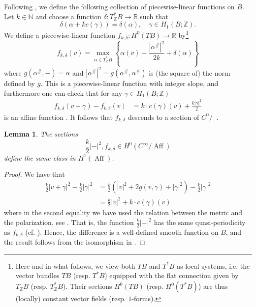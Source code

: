 \documentclass[10pt]{amsart}
\newtheorem{lem}[thm]{Lemma}
\theoremstyle{definition}
\theoremstyle{remark}
\def\N{\mathbb{N}}
\def\R{\mathbb{R}}
\def\Z{\mathbb{Z}}
\DeclareMathOperator{\Aff}{Aff}
\DeclareMathOperator{\AffZ}{\Aff_{\Z}}
\begin{document}
Following \cite[Section 3.7]{sheridan2021lagrangian}, we define the following collection of piecewise-linear functions on $B$.
Let $k \in \N$ and choose a function $\delta: T^*_\Z B \to \R$ such that 
\begin{equation}\label{eq:periodicitydelta}
    \delta(\alpha + kc(\gamma)) = \delta(\alpha), \quad \gamma \in H_1(B;\Z).
\end{equation}
We define a piecewise-linear function $f_{k,\delta} : H^0(TB) \to \R$ by\footnote{Here and in what follows, we view both $TB$ and $T^*B$ as local systems, i.e. the vector bundles $TB$ (resp. $T^*B$) equipped with the flat connection given by $T_\Z B$ (resp. $T^*_\Z B$). Their sections $H^0(TB)$ (resp. $H^0(T^*B)$) are thus  (locally) constant vector fields (resp. $1$-forms).}
\begin{equation}\label{eq:fkdeltadefn}
    f_{k,\delta}(v) = \max_{\alpha\in T^*_\Z B}
    \left\lbrace
        \alpha(v) - \frac{|\alpha^\#|^2}{2k} + \delta(\alpha)
    \right\rbrace
\end{equation}
where $g(\alpha^\#,-)=\alpha$ and $|\alpha^\#|^2 = g(\alpha^\#,\alpha^\#)$ is (the square of) the norm defined by $g$.
This is a piecewise-linear function with integer slope, and furthermore one can check that for any $\gamma \in H_1(B;\Z)$ 
\begin{align}\label{eq:periodicityfdelta}
    f_{k,\delta}(v + \gamma) - f_{k,\delta}(v) &= k\cdot c(\gamma)(v) + \frac{k |\gamma|^2}{2}
\end{align}
is an affine function \cite[Lemma 3.23]{sheridan2021lagrangian}.
It follows that $f_{k,\delta}$ descends to a section of $C^0/\AffZ$.

\begin{lem}\label{lem:appproximationfdelta}
    The sections
    $$
    \frac{k}{2}|-|^2, f_{k,\delta} \in H^0(C^\infty/\Aff)
    $$
    define the same class in $H^1(\Aff)$.
\end{lem}
\begin{proof}
    We have that
    \begin{align*}
        \frac{k}{2}|v+\gamma|^2 - \frac{k}{2}|\gamma|^2 
        &= \frac{k}{2}\left(|v|^2 + 2g(v,\gamma) + |\gamma|^2\right) - \frac{k}{2}|\gamma|^2 \\
        &= \frac{k}{2}|v|^2 + k\cdot c(\gamma)(v) 
    \end{align*}
    where in the second equality we have used the relation between the metric and the polarization, see .
    That is, the function $\frac{k}{2}|-|^2$ has the same quasi-periodicity as $f_{k,\delta}$ (cf. ).
    Hence, the difference is a well-defined smooth function on $B$, and the result follows from the isomorphism in .
\end{proof}
\end{document}
